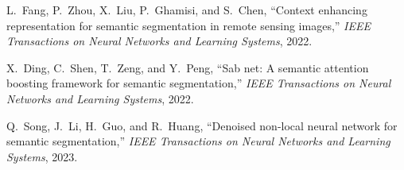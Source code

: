 \documentclass[lettersize,journal]{IEEEtran}
\begin{document}
\begin{thebibliography}{10}
L.~Fang, P.~Zhou, X.~Liu, P.~Ghamisi, and S.~Chen, ``Context enhancing
  representation for semantic segmentation in remote sensing images,''
  \emph{IEEE Transactions on Neural Networks and Learning Systems}, 2022.

X.~Ding, C.~Shen, T.~Zeng, and Y.~Peng, ``Sab net: A semantic attention
  boosting framework for semantic segmentation,'' \emph{IEEE Transactions on
  Neural Networks and Learning Systems}, 2022.

Q.~Song, J.~Li, H.~Guo, and R.~Huang, ``Denoised non-local neural network for
  semantic segmentation,'' \emph{IEEE Transactions on Neural Networks and
  Learning Systems}, 2023.

\end{thebibliography}






\newpage

\vfill
\end{document}
